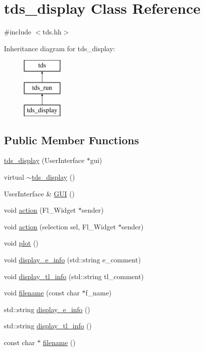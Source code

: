 \hypertarget{classtds__display}{}\section{tds\+\_\+display Class Reference}
\label{classtds__display}


{\ttfamily \#include $<$tds.\+hh$>$}

Inheritance diagram for tds\+\_\+display\+:\begin{figure}[H]
\begin{center}
\leavevmode
\includegraphics[height=3.000000cm]{classtds__display}
\end{center}
\end{figure}
\subsection*{Public Member Functions}
\begin{DoxyCompactItemize}
\item 
\hyperlink{classtds__display_a4e3eff614025d24fbe8204f98e68b6ce}{tds\+\_\+display} (User\+Interface $\ast$gui)
\item 
virtual \hyperlink{classtds__display_ab31b0f507587abe8aa7acd158e33b0bb}{$\sim$tds\+\_\+display} ()
\item 
User\+Interface \& \hyperlink{classtds__display_ac57fee94adb87f1306e35a3fd1766465}{G\+UI} ()
\item 
void \hyperlink{classtds__display_a52823b7451d3afc18eb4a712bb891125}{action} (Fl\+\_\+\+Widget $\ast$sender)
\item 
void \hyperlink{classtds__display_a7135e1577eaab18c500dd503b2b33b0b}{action} (selection sel, Fl\+\_\+\+Widget $\ast$sender)
\item 
void \hyperlink{classtds__display_a86b3c6ef9fe9d846544ce123b325ed40}{plot} ()
\item 
void \hyperlink{classtds__display_a1f5bb8fbcde47a194726ab95aa79e8eb}{display\+\_\+e\+\_\+info} (std\+::string e\+\_\+comment)
\item 
void \hyperlink{classtds__display_ac625020bac2a68d6ab799d37d7b009ea}{display\+\_\+tl\+\_\+info} (std\+::string tl\+\_\+comment)
\item 
void \hyperlink{classtds__display_a188fdc90ab4370b5d1b0b625074ce593}{filename} (const char $\ast$f\+\_\+name)
\item 
std\+::string \hyperlink{classtds__display_aec9a54ceed140fee7120cbf0e7b5d7d8}{display\+\_\+e\+\_\+info} ()
\item 
std\+::string \hyperlink{classtds__display_a1f28ae49914313afc6eb7f218d3cf8bb}{display\+\_\+tl\+\_\+info} ()
\item 
const char $\ast$ \hyperlink{classtds__display_ada7b81a067803aeb6ff761eb9de7a36b}{filename} ()
\end{DoxyCompactItemize}
